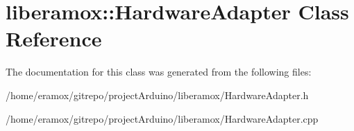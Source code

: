 \hypertarget{classliberamox_1_1HardwareAdapter}{}\section{liberamox\+:\+:Hardware\+Adapter Class Reference}
\label{classliberamox_1_1HardwareAdapter}


The documentation for this class was generated from the following files\+:\begin{DoxyCompactItemize}
\item 
/home/eramox/gitrepo/project\+Arduino/liberamox/Hardware\+Adapter.\+h\item 
/home/eramox/gitrepo/project\+Arduino/liberamox/Hardware\+Adapter.\+cpp\end{DoxyCompactItemize}
